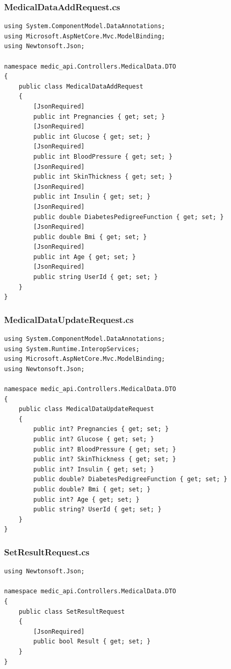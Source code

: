 \documentclass[12pt,a4paper]{article}
\begin{document}
	\subsubsection{MedicalDataAddRequest.cs}
	\begin{lstlisting}
using System.ComponentModel.DataAnnotations;
using Microsoft.AspNetCore.Mvc.ModelBinding;
using Newtonsoft.Json;

namespace medic_api.Controllers.MedicalData.DTO
{
    public class MedicalDataAddRequest
    {
        [JsonRequired]
        public int Pregnancies { get; set; }
        [JsonRequired]
        public int Glucose { get; set; }
        [JsonRequired]
        public int BloodPressure { get; set; }
        [JsonRequired]
        public int SkinThickness { get; set; }
        [JsonRequired]
        public int Insulin { get; set; }
        [JsonRequired]
        public double DiabetesPedigreeFunction { get; set; }
        [JsonRequired]
        public double Bmi { get; set; }
        [JsonRequired]
        public int Age { get; set; }
        [JsonRequired]
        public string UserId { get; set; }
    }
}
	\end{lstlisting}
	\subsubsection{MedicalDataUpdateRequest.cs}
	\begin{lstlisting}
using System.ComponentModel.DataAnnotations;
using System.Runtime.InteropServices;
using Microsoft.AspNetCore.Mvc.ModelBinding;
using Newtonsoft.Json;

namespace medic_api.Controllers.MedicalData.DTO
{
    public class MedicalDataUpdateRequest
    {
        public int? Pregnancies { get; set; }
        public int? Glucose { get; set; }
        public int? BloodPressure { get; set; }
        public int? SkinThickness { get; set; }
        public int? Insulin { get; set; }
        public double? DiabetesPedigreeFunction { get; set; }
        public double? Bmi { get; set; }
        public int? Age { get; set; }
        public string? UserId { get; set; }
    }
}
	\end{lstlisting}
	\subsubsection{SetResultRequest.cs}
	\begin{lstlisting}
using Newtonsoft.Json;

namespace medic_api.Controllers.MedicalData.DTO
{
    public class SetResultRequest
    {
        [JsonRequired]
        public bool Result { get; set; }
    }
}
	\end{lstlisting}
\end{document}
